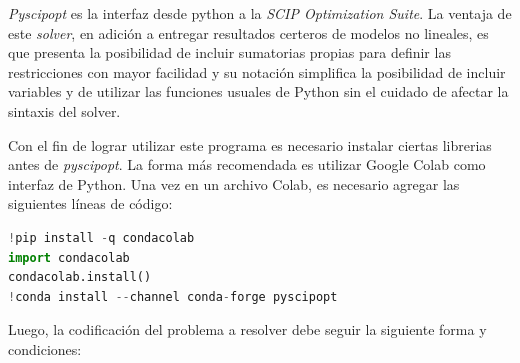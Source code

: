 \textit{Pyscipopt} es la interfaz desde python a la \textit{SCIP Optimization Suite}. La ventaja de este \textit{solver}, en adición a entregar resultados certeros de modelos no lineales, es que presenta la posibilidad de incluir sumatorias propias para definir las restricciones con mayor facilidad y su notación simplifica la posibilidad de incluir variables y de utilizar las funciones usuales de Python sin el cuidado de afectar la sintaxis del solver.
\vspace{2.5mm}

Con el fin de lograr utilizar este programa es necesario instalar ciertas librerias antes de \textit{pyscipopt}. La forma más recomendada es utilizar Google Colab como interfaz de Python. Una vez en un archivo Colab, es necesario agregar las siguientes líneas de código:


\begin{lstlisting}[language=Python]
!pip install -q condacolab
import condacolab            
condacolab.install()
!conda install --channel conda-forge pyscipopt
\end{lstlisting}
 
Luego, la codificación del problema a resolver debe seguir la siguiente forma y condiciones:

